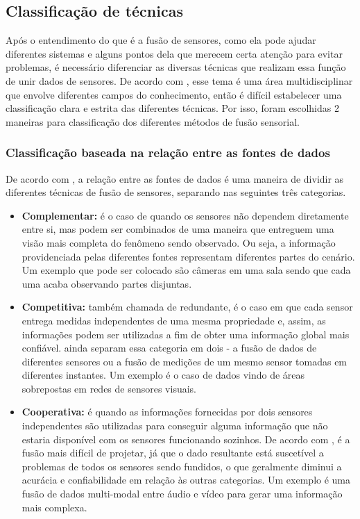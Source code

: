 \documentclass[acronym, symbols]{fei}
\begin{document}
		\subsection{Classificação de técnicas}
			Após o entendimento do que é a fusão de sensores, como ela pode ajudar diferentes sistemas e alguns pontos dela que merecem certa atenção para evitar problemas, é necessário diferenciar as diversas técnicas que realizam essa função de unir dados de sensores. De acordo com \textcite{castanedo2013review}, esse tema é uma área multidisciplinar que envolve diferentes campos do conhecimento, então é difícil estabelecer uma classificação clara e estrita das diferentes técnicas. Por isso, foram escolhidas 2 maneiras para classificação dos diferentes métodos de fusão sensorial.
			
			\subsubsection{Classificação baseada na relação entre as fontes de dados}
				De acordo com \textcite{castanedo2013review}, a relação entre as fontes de dados é uma maneira de dividir as diferentes técnicas de fusão de sensores, separando nas seguintes três categorias.
				
				\begin{itemize}
					\item \textbf{Complementar:} é o caso de quando os sensores não dependem diretamente entre si, mas podem ser combinados de uma maneira que entreguem uma visão mais completa do fenômeno sendo observado. Ou seja, a informação providenciada pelas diferentes fontes representam diferentes partes do cenário. Um exemplo que pode ser colocado são câmeras em uma sala sendo que cada uma acaba observando partes disjuntas.
					
					\item \textbf{Competitiva:} também chamada de redundante, é o caso em que cada sensor entrega medidas independentes de uma mesma propriedade e, assim, as informações podem ser utilizadas a fim de obter uma informação global mais confiável. \textcite{visser1999organisation} ainda separam essa categoria em dois - a fusão de dados de diferentes sensores ou a fusão de medições de um mesmo sensor tomadas em diferentes instantes. Um exemplo é o caso de dados vindo de áreas sobrepostas em redes de sensores visuais.
					
					\item \textbf{Cooperativa:} é quando as informações fornecidas por dois sensores independentes são utilizadas para conseguir alguma informação que não estaria disponível com os sensores funcionando sozinhos. De acordo com \textcite{brooks1998multi}, é a fusão mais difícil de projetar, já que o dado resultante está suscetível a problemas de todos os sensores sendo fundidos, o que geralmente diminui a acurácia e confiabilidade em relação às outras categorias. Um exemplo é uma fusão de dados multi-modal entre áudio e vídeo para gerar uma informação mais complexa.
				\end{itemize}
			
\end{document}
